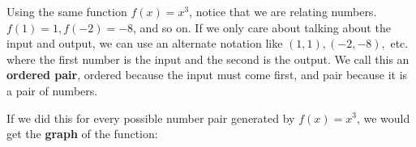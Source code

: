 \documentclass{ximera}
\begin{document}
\begin{example}

Using the same function $f(x)=x^3$, notice that we are relating numbers. $f(1)=1, f(-2)=-8$, and so on. If we only care about talking about the input and output, we can use an alternate notation like $(1,1), (-2,-8),$ etc. where the first number is the input and the second is the output. We call this an \textbf{ordered pair}, ordered because the input must come first, and pair because it is a pair of numbers.

If we did this for every possible number pair generated by $f(x)=x^3$, we would get the \textbf{graph} of the function:

\begin{image}
\end{image}
\end{example}
\end{document}
